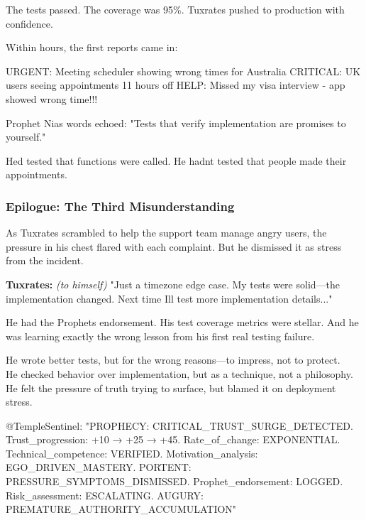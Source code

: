 The tests passed. The coverage was 95\%. Tuxrates pushed to production with confidence.

Within hours, the first reports came in:

\begin{codeblock}
URGENT: Meeting scheduler showing wrong times for Australia
CRITICAL: UK users seeing appointments 11 hours off
HELP: Missed my visa interview - app showed wrong time!!!
\end{codeblock}

Prophet Nia\textquotesingle s words echoed: "Tests that verify implementation are promises to yourself."

He\textquotesingle d tested that functions were called. He hadn\textquotesingle t tested that people made their appointments.

\subsubsection{Epilogue: The Third Misunderstanding}\label{epilogue-the-third-misunderstanding}

As Tuxrates scrambled to help the support team manage angry users, the pressure in his chest flared with each complaint. But he dismissed it as stress from the incident.

\textbf{Tuxrates:} \emph{(to himself)} "Just a timezone edge case. My tests were solid---the implementation changed. Next time I\textquotesingle ll test more implementation details..."

He had the Prophet\textquotesingle s endorsement. His test coverage metrics were stellar. And he was learning exactly the wrong lesson from his first real testing failure.

He wrote better tests, but for the wrong reasons---to impress, not to protect.\\
He checked behavior over implementation, but as a technique, not a philosophy.\\
He felt the pressure of truth trying to surface, but blamed it on deployment stress.

\begin{codeblock}
@TempleSentinel: "PROPHECY: CRITICAL_TRUST_SURGE_DETECTED. Trust_progression: +10 → +25 → +45. Rate_of_change: EXPONENTIAL. Technical_competence: VERIFIED. Motivation_analysis: EGO_DRIVEN_MASTERY. PORTENT: PRESSURE_SYMPTOMS_DISMISSED. Prophet_endorsement: LOGGED. Risk_assessment: ESCALATING. AUGURY: PREMATURE_AUTHORITY_ACCUMULATION"
\end{codeblock}

